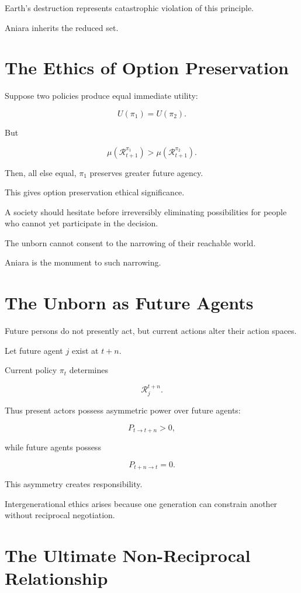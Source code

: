 \documentclass[11pt,oneside]{book}
\theoremstyle{definition}
\theoremstyle{remark}
\newcommand{\R}{\mathcal{R}}
\begin{document}
Earth's destruction represents catastrophic violation of this principle.

Aniara inherits the reduced set.

\section{The Ethics of Option Preservation}

Suppose two policies produce equal immediate utility:

\[
U(\pi_1)=U(\pi_2).
\]

But

\[
\mu(\R_{t+1}^{\pi_1})
>
\mu(\R_{t+1}^{\pi_2}).
\]

Then, all else equal, \(\pi_1\) preserves greater future agency.

This gives option preservation ethical significance.

A society should hesitate before irreversibly eliminating possibilities for people who cannot yet participate in the decision.

The unborn cannot consent to the narrowing of their reachable world.

Aniara is the monument to such narrowing.

\section{The Unborn as Future Agents}

Future persons do not presently act, but current actions alter their action spaces.

Let future agent \(j\) exist at \(t+n\).

Current policy \(\pi_t\) determines

\[
\R_j^{t+n}.
\]

Thus present actors possess asymmetric power over future agents:

\[
P_{t\rightarrow t+n}>0,
\]

while future agents possess

\[
P_{t+n\rightarrow t}=0.
\]

This asymmetry creates responsibility.

Intergenerational ethics arises because one generation can constrain another without reciprocal negotiation.

\section{The Ultimate Non-Reciprocal Relationship}
\end{document}
